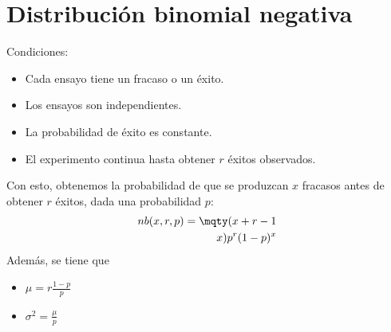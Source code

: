 \documentclass{./Probabilidad.tex}
\begin{document}
\section{Distribución binomial negativa}
Condiciones:
\begin{itemize}
	\item Cada ensayo tiene un fracaso o un éxito.
	\item Los ensayos son independientes.
	\item La probabilidad de éxito es constante.
	\item El experimento continua hasta obtener $r$ éxitos observados. 
\end{itemize}
Con esto, obtenemos la probabilidad de que se produzcan $x$ fracasos antes de obtener $r$ éxitos, dada una probabilidad $p$:
\begin{equation}
	\begin{split}
		nb(x,r,p) = \mqty(x+r-1\\x) p^{r}(1-p)^{x}
	\end{split}
\end{equation}
Además, se tiene que
\begin{itemize}
	\item $\mu = r \frac{1-p}{p}$
	\item $\sigma^{2} = \frac{\mu}{p}$ 
\end{itemize}
\end{document}
